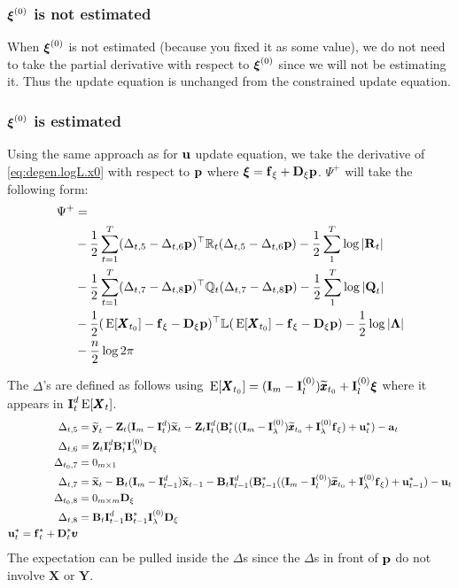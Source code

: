 \documentclass[]{article}
\def\uupsilon{\pmb{\upsilon}}
\def\xixi{\mbox{\boldmath $\xi$}}
\def\LAM{\mbox{\boldmath $\Lambda$}}
\def\LAMm{\mathbb{L}}
\def\ZZ{\mbox{$\mathbf Z$}}	\def\zz{\mbox{$\mathbf z$}}
\def\BB{\mbox{$\mathbf B$}}	\def\bb{\mbox{$\mathbf b$}}
\def\DD{\mbox{$\mathbf D$}}	\def\dd{\mbox{$\mathbf d$}}
\def\II{\mbox{$\mathbf I$}} \def\ii{\mbox{$\mathbf i$}}
\def\QQ{\mbox{$\mathbf Q$}}	 \def\qq{\mbox{$\mathbf q$}}
\def\RR{\mbox{$\mathbf R$}}	 \def\rr{\mbox{$\mathbf r$}}
\def\XX{\mbox{$\pmb{X}$}}	\def\xx{\mbox{$\pmb{x}$}}
\def\YY{\mbox{$\pmb{Y}$}}	\def\yy{\mbox{$\pmb{y}$}}
\def\E{\,\textup{\textrm{E}}}
\def\hatxt{\widetilde{\mbox{$\mathbf x$}}_t}
\def\hatxtm{\widetilde{\mbox{$\mathbf x$}}_{t-1}}
\def\hatyt{\widetilde{\mbox{$\mathbf y$}}_t}
\begin{document}
\subsubsection{$\xixi^{(0)}$ is not estimated}
When $\xixi^{(0)}$ is not estimated (because you fixed it as some value), we do not need to take the partial derivative with respect to $\xixi^{(0)}$ since we will not be estimating it. Thus the update equation is unchanged from the constrained update equation.

\subsubsection{$\xixi^{(0)}$ is estimated}
Using the same approach as for  $\mbox{$\mathbf u$}$ update equation, we take the derivative of \ref{eq:degen.logL.x0} with respect to $\mbox{$\mathbf p$}$ where $\xixi=\ff_\xi+\DD_\xi\pp$.  $\Psi^+$ will take the following form:
\begin{equation}\label{eq:degen.logL.x0.0}
\begin{split}
\Psi^+ &=   \\
&-\frac{1}{2}\sum_{t=1}^T (\Delta_{t,5} - \Delta_{t,6}\pp)^\top\Rm_t(\Delta_{t,5} - \Delta_{t,6}\pp) - \frac{1}{2}\sum_1^T\log |\RR_t| \\
& -\frac{1}{2}\sum_{t=1}^T (\Delta_{t,7} - \Delta_{t,8}\pp)^\top\Qm_t(\Delta_{t,7} - \Delta_{t,8}\pp) - \frac{1}{2}\sum_1^T\log |\QQ_t| \\
& -\frac{1}{2} (\E[\XX_{t_0}] - \ff_\xi - \DD_\xi\pp)^\top\LAMm(\E[\XX_{t_0}] - \ff_\xi - \DD_\xi\pp) - \frac{1}{2}\log |\LAM| \\
& - \frac{n}{2}\log 2\pi \\
\end{split}
\end{equation}

The $\Delta$'s are defined as follows using $ \E[\XX_{t_0}]=(\II_m-\II_l^{(0)})\widetilde{\xx}_{t_0}+\II_l^{(0)}\xixi$ where it appears in $\II_t^d\E[\XX_t]$.
\begin{equation}\label{eq:degen.x0.update.Deltas}
\begin{split}
\Delta_{t,5}&=\hatyt - \ZZ_t(\II_m - \II_t^d)\hatxt - \ZZ_t\II_t^{d}(\BB^*_t((\II_m-\II_\lambda^{(0)})\widetilde{\xx}_{t_0}+\II_\lambda^{(0)} \ff_\xi) + \uu^*_t) - \aa_t \\
\Delta_{t,6}&= \ZZ_t\II_t^{d}\BB^*_t\II_\lambda^{(0)}\DD_\xi \\
\Delta_{t_0,7}&=0_{m\times 1} \\
\Delta_{t,7}&=\hatxt - \BB_t(\II_m - \II_{t-1}^d)\hatxtm - \BB_t\II_{t-1}^{d}(\BB^*_{t-1} ((\II_m-\II_l^{(0)})\widetilde{\xx}_{t_0}+\II_\lambda^{(0)} \ff_\xi) + \uu^*_{t-1}) - \uu_t \\
\Delta_{t_0,8}&=0_{m\times m} \DD_\xi\\
\Delta_{t,8}&=\BB_t\II_{t-1}^{d}\BB^*_{t-1}\II_\lambda^{(0)}\DD_\xi\\
\uu^*_t=\ff^*_t+\DD^*_t\uupsilon
\end{split}
\end{equation}
The expectation can be pulled inside the $\Delta$s since the $\Delta$s in front of $\mbox{$\mathbf p$}$ do not involve $\XX$ or $\YY$.
\end{document}
